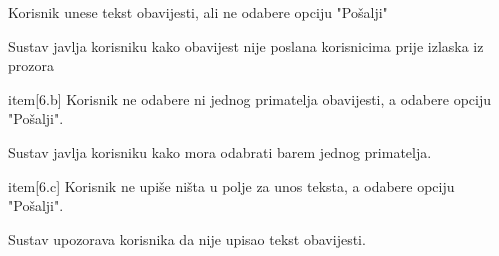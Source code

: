 \begin{packed_item}
\begin{packed_enum}
							\item[6.a] Korisnik unese tekst obavijesti, ali ne odabere opciju "Pošalji"
							\item[] \begin{packed_enum}
								\item[1.] Sustav javlja korisniku kako obavijest nije poslana korisnicima prije izlaska iz prozora
							\end{packed_enum}
							item[6.b] Korisnik ne odabere ni jednog primatelja obavijesti, a odabere opciju "Pošalji".
							\item[] \begin{packed_enum}
								\item[1.] Sustav javlja korisniku kako mora odabrati barem jednog primatelja.
							\end{packed_enum}
							item[6.c] Korisnik ne upiše ništa u polje za unos teksta, a odabere opciju "Pošalji".
							\item[] \begin{packed_enum}
								\item[1.] Sustav upozorava korisnika da nije upisao tekst obavijesti.
							\end{packed_enum}
							
						\end{packed_enum}
					\end{packed_item}


